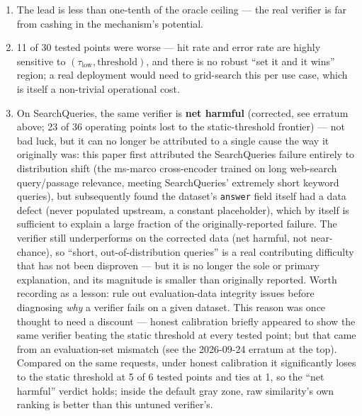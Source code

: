 \documentclass[11pt]{article}
\newcommand{\taulow}{\ensuremath{\tau_{\text{low}}}}
\begin{document}
\begin{enumerate}[leftmargin=*]
  \item The lead is less than one-tenth of the oracle ceiling --- the real verifier is far from cashing in the mechanism's potential.
  \item 11 of 30 tested points were worse --- hit rate and error rate are highly sensitive to $(\taulow, \text{threshold})$, and there is no robust ``set it and it wins'' region; a real deployment would need to grid-search this per use case, which is itself a non-trivial operational cost.
  \item On SearchQueries, the same verifier is \textbf{net harmful} (corrected, see erratum above; 23 of 36 operating points lost to the static-threshold frontier) --- not bad luck, but it can no longer be attributed to a single cause the way it originally was: this paper first attributed the SearchQueries failure entirely to distribution shift (the ms-marco cross-encoder trained on long web-search query/passage relevance, meeting SearchQueries' extremely short keyword queries), but subsequently found the dataset's \texttt{answer} field itself had a data defect (never populated upstream, a constant placeholder), which by itself is sufficient to explain a large fraction of the originally-reported failure. The verifier still underperforms on the corrected data (net harmful, not near-chance), so ``short, out-of-distribution queries'' is a real contributing difficulty that has not been disproven --- but it is no longer the sole or primary explanation, and its magnitude is smaller than originally reported. Worth recording as a lesson: rule out evaluation-data integrity issues before diagnosing \emph{why} a verifier fails on a given dataset. This reason was once thought to need a discount --- honest calibration briefly appeared to show the same verifier beating the static threshold at every tested point; but that came from an evaluation-set mismatch (see the 2026-09-24 erratum at the top). Compared on the same requests, under honest calibration it significantly loses to the static threshold at 5 of 6 tested points and ties at 1, so the ``net harmful'' verdict holds; inside the default gray zone, raw similarity's own ranking is better than this untuned verifier's.
\end{enumerate}
\end{document}
